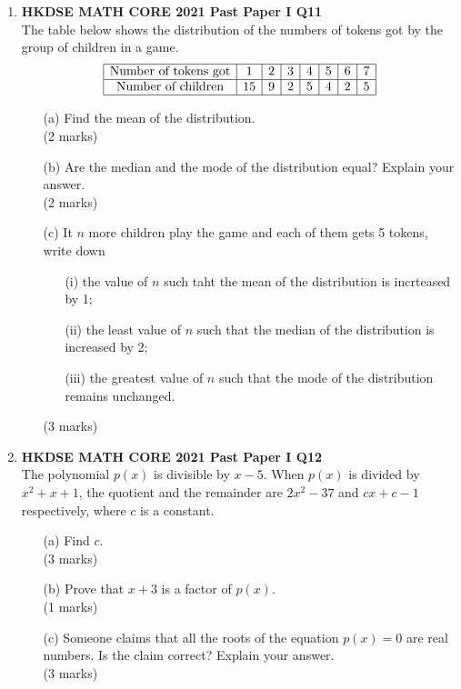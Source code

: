 \documentclass[12pt]{article}
\begin{document}
\begin{enumerate}
	\item \textbf{HKDSE MATH CORE 2021 Past Paper I Q11}\\
	The table below shows the distribution of the numbers of tokens got by the group of children in a game.
	$$\begin{array}{|c|c|c|c|c|c|c|c|}
		\hline
		\text{Number of tokens got} & 1 & 2 & 3 & 4 & 5 & 6 & 7 \\
		\hline
		\text{Number of children} & 15 & 9 & 2 & 5 & 4 & 2 & 5 \\
		\hline
	\end{array}$$
	\begin{enumerate}
		\item[(a)] Find the mean of the distribution. \\(2 marks)
		\item[(b)] Are the median and the mode of the distribution equal? Explain your answer. \\(2 marks)
		\item[(c)] It $n$ more children play the game and each of them gets 5 tokens, write down
		\begin{enumerate}
			\item[(i)] the value of $n$ such taht the mean of the distribution is incrteased by 1;
			\item[(ii)] the least value of $n$ such that the median of the distribution is increased by 2;
			\item[(iii)] the greatest value of $n$ such that the mode of the distribution remains unchanged.
		\end{enumerate}
		(3 marks)
	\end{enumerate}

	\item \textbf{HKDSE MATH CORE 2021 Past Paper I Q12}\\	
	The polynomial $p(x)$ is divisible by $x - 5$. When $p(x)$ is divided by $x^2 + x + 1$, the quotient and the remainder are $2x^2 - 37$ and $cx + c - 1$ respectively, where $c$ is a constant.
	\begin{enumerate}
		\item[(a)] Find $c$. \\(3 marks)
		\item[(b)] Prove that $x+3$ is a factor of $p(x)$. \\(1 marks)
		\item[(c)] Someone claims that all the roots of the equation $p(x) = 0$ are real numbers. Is the claim correct? Explain your answer. \\(3 marks)
	\end{enumerate}


\end{enumerate}
\end{document}
